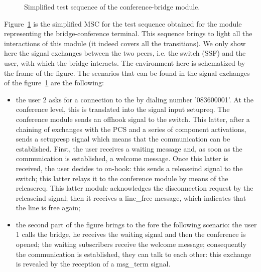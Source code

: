 \begin{figure}[htbp]
\begin{center}
\begin{bigbox}
\end{bigbox}
\caption{Simplified test sequence of the conference-bridge module.}
\label{msc}
\end{center}
\end{figure}

Figure~\ref{msc} is the simplified MSC for the test sequence obtained
for the module representing the bridge-conference terminal. This
sequence brings to light all the interactions of this module (it
indeed covers all the transitions). We only show here the signal
exchanges between the two peers, i.e. the switch (SSF) and the user,
with which the bridge interacts. The environment here is schematized
by the frame of the figure. The scenarios that can be found in the
signal exchanges of the figure~\ref{msc} are the following:

\begin{itemize}
  \item the user 2 asks for a connection to the \audio by dialing
        number '083600001'. At the conference level, this is
        translated into the signal input \textsf{setupreq}. The
        conference module sends an \textsf{offhook} signal to the
        switch. This latter, after a chaining of exchanges with the PCS
        and a series of component activations, sends a
        \textsf{setupresp} signal which means that the communication
        can be established. First, the user receives a waiting
        message and, as soon as the communication is established, a
        welcome message. Once this latter is received, the user
        decides to on-hook: this sends a \textsf{releaseind} signal to
        the switch; this latter relays it to the conference module by
        means of the \textsf{releasereq}. This latter module
        acknowledges the disconnection request by the
        \textsf{releaseind} signal; then it receives a
        \textsf{line\_free} message, which indicates that the line is
        free again;

  \item the second part of the figure brings to the fore the following
        scenario: the user 1 calls the bridge, he receives the
        waiting signal and then the conference is opened; the waiting
        subscribers receive the welcome message; consequently the
        communication is established, they can talk to each other:
        this exchange is revealed by the reception of a
        \textsf{msg\_term} signal.
\end{itemize}


